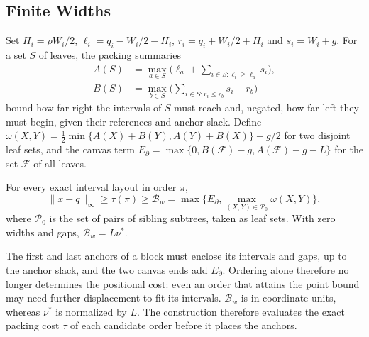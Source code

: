\subsection{Finite Widths}
Set $H_i=\rho W_i/2$, $\ell_i=q_i-W_i/2-H_i$, $r_i=q_i+W_i/2+H_i$ and $s_i=W_i+g$. For a set $S$ of leaves, the packing summaries
\begin{equation}\label{eq:packing}
\begin{split}
A(S)&=\max_{a\in S}\bigl(\ell_a+\sum_{i\in S:\ell_i\ge\ell_a}s_i\bigr),\\
B(S)&=\max_{b\in S}\bigl(\sum_{i\in S:r_i\le r_b}s_i-r_b\bigr)
\end{split}
\end{equation}
bound how far right the intervals of $S$ must reach and, negated, how far left they must begin, given their references and anchor slack. Define $\omega(X,Y)=\tfrac12\min\{A(X)+B(Y),A(Y)+B(X)\}-g/2$ for two disjoint leaf sets, and the canvas term $E_\partial=\max\{0,B(\mathcal F)-g,A(\mathcal F)-g-L\}$ for the set $\mathcal F$ of all leaves.
\begin{proposition}\label{thm:width}
For every exact interval layout in order $\pi$,
\begin{equation}\label{eq:widthbound}
\|x-q\|_\infty\ge\tau(\pi)\ge\mathcal B_w
=\max\{E_\partial,\max_{(X,Y)\in\mathcal P_0}\omega(X,Y)\},
\end{equation}
where $\mathcal P_0$ is the set of pairs of sibling subtrees, taken as leaf sets. With zero widths and gaps, $\mathcal B_w=L\nu^*$.
\end{proposition}
The first and last anchors of a block must enclose its intervals and gaps, up to the anchor slack, and the two canvas ends add $E_\partial$. Ordering alone therefore no longer determines the positional cost: even an order that attains the point bound may need further displacement to fit its intervals. $\mathcal B_w$ is in coordinate units, whereas $\nu^*$ is normalized by $L$. The construction therefore evaluates the exact packing cost $\tau$ of each candidate order before it places the anchors.

